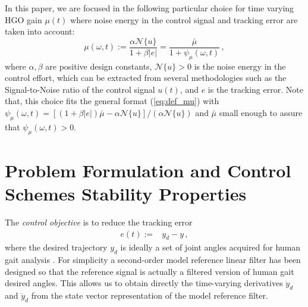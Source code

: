 \documentclass[letterpaper, 10 pt, journal, twocolumn]{IEEEtran}  %
\theoremstyle{plain}
\theoremstyle{definition}
\theoremstyle{remark}
\begin{document}
In this paper, we are focused in the following particular choice for time varying HGO gain $\mu(t)$ where noise energy in the control signal and tracking error are taken into account: 
%
\begin{equation}
\mu(\omega,t):=\frac{\alpha \mathcal{N}\{u\}}{1+\beta |e|}=\frac{\bar{\mu}}{1+
\psi_\mu(\omega,t)}\,,\label{eq:def_mupratico}
\end{equation}
%
where $\alpha,\beta$ are positive design constants, $\mathcal{N}\{u\}>0$ is the noise energy in the control effort, which can be extracted from several  methodologies  such as the Signal-to-Noise ratio of the control signal $u(t)$, and $e$ is the tracking error. Note that, this choice fits the general format (\ref{eq:def_mu}) with $\psi_\mu(\omega,t)=[(1+\beta |e|) \bar{\mu}-\alpha \mathcal{N}\{u\}]/(\alpha \mathcal{N}\{u\})$ and $\bar{\mu}$ small enough to assure that  $\psi_\mu(\omega,t)>0$. 


\section{Problem Formulation and Control Schemes Stability Properties}

The {\em control objective} is to reduce the tracking error 
%
\begin{align}
e(t) := & y_{d} - y\,,
\end{align}
%
where the desired trajectory $y_d$ is ideally a set of joint angles acquired for human gait analysis \cite{Schwartz2008}. For simplicity a second-order model reference linear filter%
%
%
has been designed so that the reference signal is actually a filtered version of human gait desired angles. This allows us to obtain directly the  time-varying derivatives $\dot{y}_d$ and $\ddot{y}_d$ from the state vector representation of the model reference filter.
\end{document}

